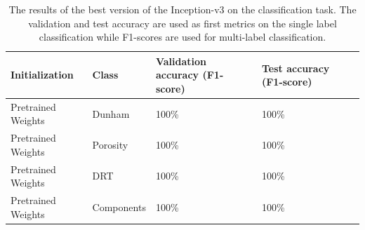 \begin{table}
\caption{\label{tab:googbest} The results of the best version of the Inception-v3 on the classification task. The validation and test accuracy are used as first metrics on the single label classification while F1-scores are used for multi-label classification.}
\centering
\begin{tabular}[b]{| l | l | l | l | l |}
\hline
    Initialization & Class & Validation accuracy (F1-score) & Test accuracy (F1-score) \ \\ \hline
    Pretrained Weights & Dunham &  100\%  & 100\% \\ \hline
    Pretrained Weights & Porosity & 100\%  &  100\% \\ \hline
    Pretrained Weights &DRT & 100\% & 100\% \\ \hline
    Pretrained Weights &Components & 100\% &  100\% \\ \hline
\end{tabular} 
\end{table}


